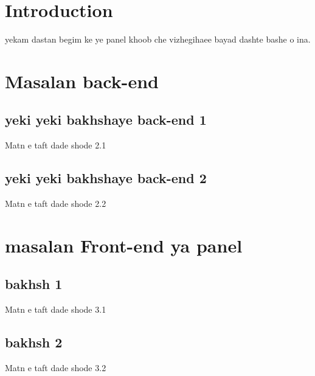 \section{Introduction}
    yekam dastan begim ke ye panel khoob che vizhegihaee bayad dashte bashe o ina.
\section{Masalan back-end}
    \subsection{yeki yeki bakhshaye back-end 1}
        Matn e taft dade shode 2.1
    \subsection{yeki yeki bakhshaye back-end 2}
        Matn e taft dade shode 2.2
\section{masalan Front-end ya panel}
    \subsection{bakhsh 1}
        Matn e taft dade shode 3.1
    \subsection{bakhsh 2}
        Matn e taft dade shode 3.2



